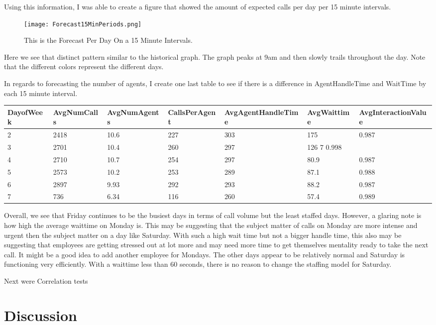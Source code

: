 \documentclass[12pt]{article}
\begin{document}
  Using this information, I was able to create a figure that showed the amount of expected calls per day per 15 minute intervals. 
  \begin{figure}[H]
    \centering
    \texttt{[image: Forecast15MinPeriods.png]}
    \caption{This is the Forecast Per Day On a 15 Minute Intervals.}
    \label{fig:Forecast}
  \end{figure}
Here we see that distinct pattern similar to the historical graph. The graph peaks at 9am and then slowly trails throughout the day.
Note that the different colors represent the different days.

In regards to forecasting the number of agents, I create one last table to see if there is a difference in AgentHandleTime and WaitTime
by each 15 minute interval.
\begin{table}[H]
  \resizebox{\textwidth}{!} {
  \begin{tabular}{ l | l | l | l | l | l | l |}
    {\bf DayofWeek} & {\bf AvgNumCalls} & {\bf AvgNumAgents} & {\bf CallsPerAgent} & {\bf AvgAgentHandleTime} & {\bf AvgWaittime} & {\bf AvgInteractionValue}\\
  \hline
  2 & 2418 & 10.6 & 227 & 303 & 175 & 0.987 \\
  \hline
  3 & 2701 & 10.4 & 260 & 297 & 126 7 0.998\\
  \hline
  4 & 2710 & 10.7 & 254 & 297 & 80.9 & 0.987 \\
  \hline
  5 & 2573 & 10.2 & 253 & 289 & 87.1 & 0.988 \\
  \hline
  6 & 2897 & 9.93 & 292 & 293 & 88.2 & 0.987 \\
  \hline
  7 & 736 & 6.34 & 116 & 260 & 57.4 & 0.989\\
  \end{tabular}
  }
  \end{table}
Overall, we see that Friday continues to be the busiest days in terms of call volume but the least staffed days. However, a glaring note
is how high the average waittime on Monday is. This may be suggesting that the subject matter of calls on Monday are more intense and urgent
then the subject matter on a day like Saturday. With such a high wait time but not a bigger handle time, this also may be suggesting that
employees are getting stressed out at lot more and may need more time to get themselves mentality ready to take the next call. It might be a good idea to add another employee for Mondays. 
The other days appear to be relatively normal and Saturday is functioning very efficiently. With a waittime less than 60 seconds, there is no reason to change the staffing model for
Saturday. 

Next were Correlation tests 



\section*{Discussion}




\end{document}
